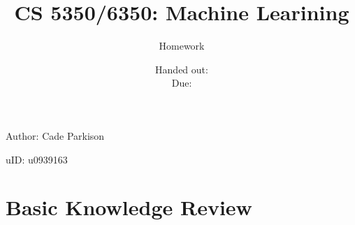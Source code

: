 \documentclass[12pt, fullpage,letterpaper]{article}
\title{CS 5350/6350: Machine Learining \semester}
\author{Homework \assignmentId}
\date{Handed out: \releaseDate\\
  Due: \dueDate}
\begin{document}
\maketitle

Author: Cade Parkison

uID: u0939163






\section*{Basic Knowledge Review}
\label{sec:q1}

\end{document}
